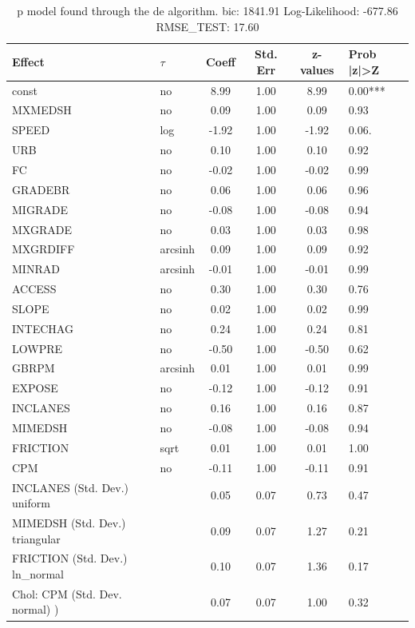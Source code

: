 \begin{table}
	\caption{p model found through the de algorithm. bic: 1841.91 Log-Likelihood: -677.86 RMSE_TEST: 17.60}
	\begin{center}
		\begin{tabular}{|l|l|c|c|c|l|}
			\hline
			Effect & $\tau$ & Coeff & Std. Err & z-values & Prob |z|>Z \\
			\hline
			const & no & 8.99 & 1.00 & 8.99 & 0.00*** \\
			\hline
			MXMEDSH & no & 0.09 & 1.00 & 0.09 & 0.93 \\
			\hline
			SPEED & log & -1.92 & 1.00 & -1.92 & 0.06. \\
			\hline
			URB & no & 0.10 & 1.00 & 0.10 & 0.92 \\
			\hline
			FC & no & -0.02 & 1.00 & -0.02 & 0.99 \\
			\hline
			GRADEBR & no & 0.06 & 1.00 & 0.06 & 0.96 \\
			\hline
			MIGRADE & no & -0.08 & 1.00 & -0.08 & 0.94 \\
			\hline
			MXGRADE & no & 0.03 & 1.00 & 0.03 & 0.98 \\
			\hline
			MXGRDIFF & arcsinh & 0.09 & 1.00 & 0.09 & 0.92 \\
			\hline
			MINRAD & arcsinh & -0.01 & 1.00 & -0.01 & 0.99 \\
			\hline
			ACCESS & no & 0.30 & 1.00 & 0.30 & 0.76 \\
			\hline
			SLOPE & no & 0.02 & 1.00 & 0.02 & 0.99 \\
			\hline
			INTECHAG & no & 0.24 & 1.00 & 0.24 & 0.81 \\
			\hline
			LOWPRE & no & -0.50 & 1.00 & -0.50 & 0.62 \\
			\hline
			GBRPM & arcsinh & 0.01 & 1.00 & 0.01 & 0.99 \\
			\hline
			EXPOSE & no & -0.12 & 1.00 & -0.12 & 0.91 \\
			\hline
			INCLANES & no & 0.16 & 1.00 & 0.16 & 0.87 \\
			\hline
			MIMEDSH & no & -0.08 & 1.00 & -0.08 & 0.94 \\
			\hline
			FRICTION & sqrt & 0.01 & 1.00 & 0.01 & 1.00 \\
			\hline
			CPM & no & -0.11 & 1.00 & -0.11 & 0.91 \\
			\hline
			INCLANES (Std. Dev.) uniform &  & 0.05 & 0.07 & 0.73 & 0.47 \\
			\hline
			MIMEDSH (Std. Dev.) triangular &  & 0.09 & 0.07 & 1.27 & 0.21 \\
			\hline
			FRICTION (Std. Dev.) ln_normal &  & 0.10 & 0.07 & 1.36 & 0.17 \\
			\hline
			 Chol: CPM (Std. Dev. normal) ) &  & 0.07 & 0.07 & 1.00 & 0.32 \\
			\hline
		\end{tabular}
	\end{center}
\end{table}